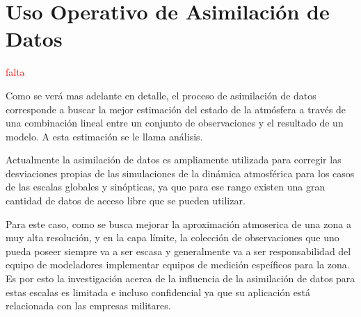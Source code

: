 \section{Uso Operativo de Asimilación de Datos}
\textcolor{red}{falta}

Como se verá mas adelante en detalle, el proceso de asimilación de datos corresponde a buscar la mejor  estimación del estado de la atmósfera a través de una combinación lineal entre un conjunto de observaciones y el resultado de un modelo. A esta estimación se le llama análisis.

Actualmente la asimilación de datos es ampliamente utilizada para corregir las desviaciones propias de las simulaciones de la dinámica atmosférica para los casos de las escalas globales y sinópticas, ya que para ese rango existen una gran cantidad de datos de acceso libre que se pueden utilizar.

Para este caso, como se busca mejorar la aproximación atmoserica de una zona a muy alta resolución, y en la capa límite, la colección de observaciones que uno pueda poseer siempre va a ser escasa y generalmente va a ser responsabilidad del equipo de modeladores implementar equipos de medición espeíficos para la zona. Es por esto la investigación acerca de la influencia de la asimilación de datos para estas escalas es limitada e incluso confidencial ya que su aplicación está relacionada con las empresas militares.



